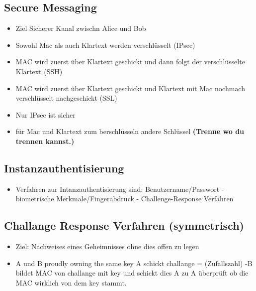 \documentclass[a4paper,10pt]{scrartcl}
\begin{document}
       \subsection{Secure Messaging}
        \begin{itemize}
         \item Ziel Sicherer Kanal zwischn Alice und Bob
         \item Sowohl Mac als auch Klartext werden verschlüsselt (IPsec)
         \item MAC wird zuerst über Klartext geschickt und dann folgt der verschlüsselte Klartext (SSH)
         \item MAC wird zuerst über Klartext geschickt und Klartext mit Mac nochmach verschlüsselt nachgeschickt (SSL)
         \item Nur IPsec ist sicher
         \item für Mac und Klartext zum berschlüsseln andere Schlüssel \textbf{(Trenne wo du trennen kannst.)}
        \end{itemize}
       \subsection{Instanzauthentisierung}
       \begin{itemize}
        \item Verfahren zur Intanzauthentisierung sind: Benutzername/Passwort - biometrische Merkmale/Fingerabdruck - Challenge-Response Verfahren
       \end{itemize}
       \subsection{Challange Response Verfahren (symmetrisch)}
       \begin{itemize}
       \item Ziel: Nachweises eines Geheimnisses ohne dies offen zu legen
       \item A und B proudly owning the same key A schickt challange = (Zufallszahl) -B bildet MAC von challange mit key und schickt dies A zu A überprüft ob die MAC wirklich von
       dem key stammt.
       \end{itemize}
\end{document}
